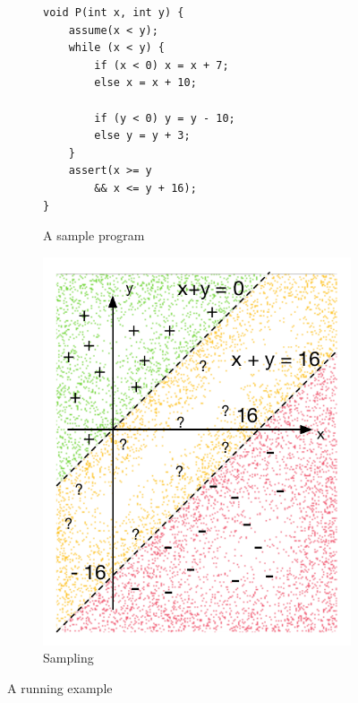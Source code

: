 \begin{figure}[t]
\begin{subfigure}{0.5\textwidth}
    \raggedright
    \vspace{0.5cm}
{\scriptsize\begin{verbatim}
void P(int x, int y) {
    assume(x < y);
    while (x < y) {
        if (x < 0) x = x + 7;
        else x = x + 10;

        if (y < 0) y = y - 10;
        else y = y + 3;
    }
    assert(x >= y
        && x <= y + 16);
}
\end{verbatim}}
    \vspace{0.5cm}
    \caption{A sample program}
    \label{fig:running:example:program}
\end{subfigure}%
\begin{subfigure}{.5\textwidth}
      \centering
      \includegraphics[scale=0.42]{figures/running-sampling.pdf}
      \caption{Sampling}
      \label{fig:running:example:sampling}
\end{subfigure}
\caption{A running example}
\label{fig:running:example}
\end{figure}

